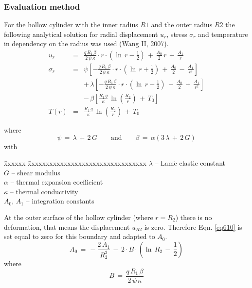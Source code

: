 
\subsubsection{Evaluation method}

For the hollow cylinder with the inner radius $R1$ and the outer radius $R2$ the following analytical solution for radial displacement $u_r$, stress $\sigma_r$ and temperature in dependency on the radius was used (Wang II, 2007).
\begin{eqnarray}
u_r & = &
\frac{q\,R_1\,\beta}{2\,\psi\,\kappa}\cdot r\cdot
\left(\ln\,r-\frac{1}{2}\right)\,+\,
\frac{A_0}{2}\,r\,+\,
\frac{A_1}{r}
\label{eq610} \\[2.0ex]
\sigma_r & = &
\psi\left[
-\frac{q\,R_1\,\beta}{2\,\psi\,\kappa}\cdot r\cdot
\left(\ln\,r+\frac{1}{2}\right)\,+\,
\frac{A_0}{2}\,-\,
\frac{A_1}{r^2}
\right] \nonumber \\[1.5ex]
 & & +\,
\lambda\left[
-\frac{q\,R_1\,\beta}{2\,\psi\,\kappa}\cdot r\cdot
\left(\ln\,r-\frac{1}{2}\right)\,+\,
\frac{A_0}{2}\,+\,
\frac{A_1}{r^2}
\right] \nonumber \\[1.5ex]
& & -\,\beta\left[
\frac{R_1\,q}{\kappa}\,\ln\left(\frac{R_2}{r}\right)\,+\,T_0
\right]
\label{eq611} \\[2.0ex]
T(r) & = &
\frac{R_1\,q}{\kappa}\,\ln\left(\frac{R_2}{r}\right)\,+\,T_0
\label{eq612}
\end{eqnarray}
{\small
where
\begin{displaymath}
\psi\,=\,\lambda\,+\,2\,G\qquad\mathrm{and}\qquad
\beta\,=\,\alpha\left(3\,\lambda\,+\,2\,G\right)
\end{displaymath}
with
\begin{tabbing}
\=xxxxxx \=xxxxxxxxxxxxxxxxxxxxxxxxxxxxxxxxx  \kill
\> $\lambda$   \> -- Lam$\acute{\mathrm{e}}$ elastic constant \\[0.5ex]
\> $G$         \> -- shear modulus \\[0.5ex]
\> $\alpha$    \> -- thermal expansion coefficient \\[0.5ex]
\> $\kappa$    \> -- thermal conductivity \\[0.5ex]
\> $A_0,\,A_1$ \> -- integration constants
\end{tabbing}
}

At the outer surface of the hollow cylinder (where $r=R_2$) there is no deformation, that means the displacement $u_{R2}$ is zero. Therefore Eqn. \ref{eq610} is set equal to zero for this boundary and adapted to $A_0$.
\begin{equation}
A_0\,=\,-\frac{2\,A_1}{R^2_2}\,-\,2\cdot B\cdot
\left(\ln\,R_2\,-\,\frac{1}{2}\right)
\label{eq613}
\end{equation}
{\small
where
}
\begin{displaymath}
B\,=\,\frac{q\,R_1\,\beta}{2\,\psi\,\kappa}
\end{displaymath}

